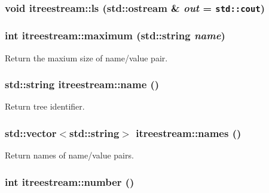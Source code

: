 \hypertarget{classitreestream_a32}{
\subsubsection[ls]{\setlength{\rightskip}{0pt plus 5cm}void itreestream::ls (std::ostream \& {\em out} = {\tt std::cout})}}
\label{classitreestream_a32}


\hypertarget{classitreestream_a22}{
\subsubsection[maximum]{\setlength{\rightskip}{0pt plus 5cm}int itreestream::maximum (std::string {\em name})}}
\label{classitreestream_a22}


Return the maxium size of name/value pair. 

\hypertarget{classitreestream_a23}{
\subsubsection[name]{\setlength{\rightskip}{0pt plus 5cm}std::string itreestream::name ()}}
\label{classitreestream_a23}


Return tree identifier. 

\hypertarget{classitreestream_a28}{
\subsubsection[names]{\setlength{\rightskip}{0pt plus 5cm}std::vector$<$std::string$>$ itreestream::names ()}}
\label{classitreestream_a28}


Return names of name/value pairs. 

\hypertarget{classitreestream_a25}{
\subsubsection[number]{\setlength{\rightskip}{0pt plus 5cm}int itreestream::number ()}}
\label{classitreestream_a25}


